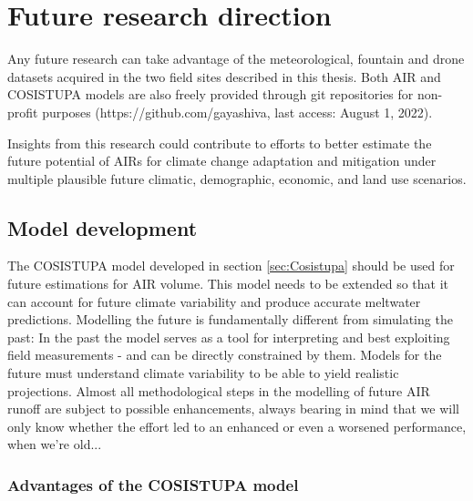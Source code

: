 \section{Future research direction}

Any future research can take advantage of the meteorological, fountain and drone datasets acquired in the two field
sites described in this thesis. Both AIR and COSISTUPA models are also freely provided through git repositories
for non-profit purposes (https://github.com/gayashiva, last access: August 1, 2022).

Insights from this research could contribute to efforts to better estimate the future potential of AIRs for
climate change adaptation and mitigation under multiple plausible future climatic, demographic, economic, and
land use scenarios.

\subsection{Model development}

The COSISTUPA model developed in section \ref{sec:Cosistupa} should be used for future estimations for AIR volume. This model
needs to be extended so that it can account for future climate variability and produce accurate meltwater
predictions. Modelling the future is fundamentally different from simulating the past: In the past the model
serves as a tool for interpreting and best exploiting field measurements - and can be directly constrained by
them. Models for the future must understand climate variability to be able to yield realistic projections.
Almost all methodological steps in the modelling of future AIR runoff are subject to possible enhancements,
always bearing in mind that we will only know whether the effort led to an enhanced or even a worsened
performance, when we're old...

\subsubsection{Advantages of the COSISTUPA model}


